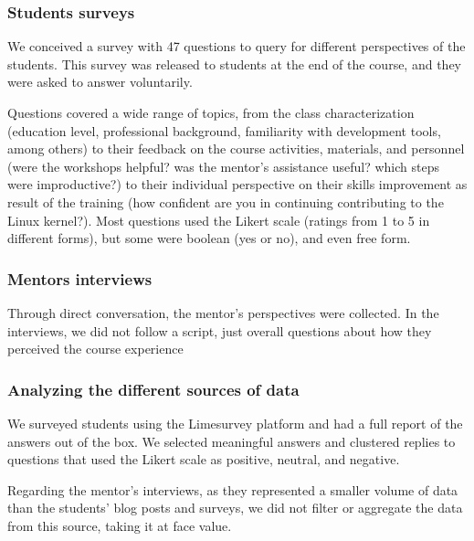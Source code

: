 \subsubsection{Students surveys}

We conceived a survey with 47 questions to query for different perspectives of
the students. This survey was released to students at the end of the course, and
they were asked to answer voluntarily.

Questions covered a wide range of topics, from the class characterization
(education level, professional background, familiarity with development tools,
among others) to their feedback on the course activities, materials, and
personnel (were the workshops helpful? was the mentor's assistance useful? which
steps were improductive?) to their individual perspective on their skills
improvement as result of the training (how confident are you in continuing
contributing to the Linux kernel?). Most questions used the Likert scale
(ratings from 1 to 5 in different forms), but some were boolean (yes or no), and
even free form.

\subsubsection{Mentors interviews}

Through direct conversation, the mentor's perspectives were collected. In the
interviews, we did not follow a script, just overall questions about how they
perceived the course experience

\subsubsection{Analyzing the different sources of data}

We surveyed students using the Limesurvey platform and had a full report of the
answers out of the box. We selected meaningful answers and clustered replies to
questions that used the Likert scale as positive, neutral, and negative.

Regarding the mentor's interviews, as they represented a smaller volume of data
than the students' blog posts and surveys, we did not filter or aggregate the
data from this source, taking it at face value.
